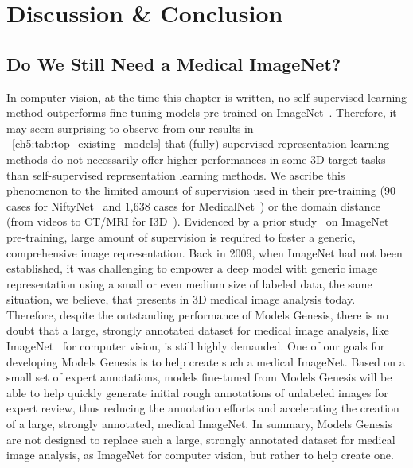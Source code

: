\section{Discussion \& Conclusion}
\label{ch5:discussion}

\subsection{Do We Still Need a Medical ImageNet?}
\label{ch5:medical_imagenet}

In computer vision, at the time this chapter is written, no self-supervised learning method outperforms fine-tuning models pre-trained on ImageNet~\citep{jing2020self,chen2019self,kolesnikov2019revisiting,zhou2019models,hendrycks2019using,zhang2019aet,caron2019unsupervised}. Therefore, it may seem surprising to observe from our results in \tablename~\ref{ch5:tab:top_existing_models} that (fully) supervised representation learning methods do not necessarily offer higher performances in some 3D target tasks than self-supervised representation learning methods. We ascribe this phenomenon to the limited amount of supervision used in their pre-training (90 cases for NiftyNet~\citep{gibson2018niftynet} and 1,638 cases for MedicalNet~\citep{chen2019med3d}) or the domain distance (from videos to CT/MRI for I3D~\citep{carreira2017quo}). Evidenced by a prior study~\citep{sun2017revisiting} on ImageNet pre-training, large amount of supervision is required to foster a generic, comprehensive image representation. Back in 2009, when ImageNet had not been established, it was challenging to empower a deep model with generic image representation using a small or even medium size of labeled data, the same situation, we believe, that presents in 3D medical image analysis today. Therefore, despite the outstanding performance of Models Genesis, there is no doubt that a large, strongly annotated dataset for medical image analysis, like ImageNet~\citep{deng2009imagenet} for computer vision, is still highly demanded. One of our goals for developing Models Genesis is to help create such a medical ImageNet. Based on a small set of expert annotations, models fine-tuned from Models Genesis will be able to help quickly generate initial rough annotations of unlabeled images for expert review, thus reducing the annotation efforts and accelerating the creation of a large, strongly annotated, medical ImageNet. In summary, Models Genesis are not designed to replace such a large, strongly annotated dataset for medical image analysis, as ImageNet for computer vision, but rather to help create one.



